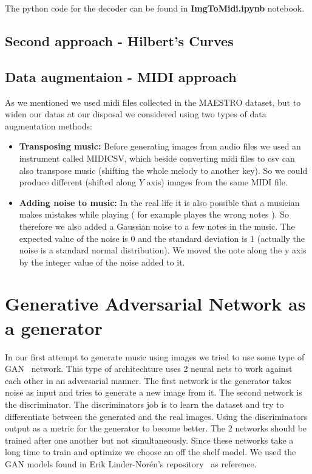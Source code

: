 \documentclass{article}
\begin{document}
	The python code for the decoder can be found in \textbf{ImgToMidi.ipynb} notebook.
	
\subsection{Second approach - Hilbert's Curves}



\subsection{Data augmentaion - MIDI approach}

As we mentioned we used midi files collected in the MAESTRO dataset, but to widen our datas at our disposal we considered using two types of data augmentation methods: 
\begin{itemize}
	\item \textbf{Transposing music: } Before generating images from audio files we used an instrument called MIDICSV, which beside converting midi files to csv can also transpose music (shifting the whole melody to another key). So we could produce different (shifted along $Y$ axis) images from the same MIDI file.
	
	\item \textbf{Adding noise to music: } In the real life it is also possible that a musician makes mistakes while playing ( for example playes the wrong notes ). So therefore we also added a Gaussian noise to a few notes in the music. The expected value of the noise is 0 and the standard deviation is 1 (actually the noise is a standard normal distribution). We moved the note along the y axis by the integer value of the noise added to it.
\end{itemize}

\section{Generative Adversarial Network as a generator}
\label{sec:gan}

In our first attempt to generate music using images we tried to use some type of GAN~\cite{gan} network. This type of architechture uses 2 neural nets to work against each other in an adversarial manner. The first network is the generator takes noise as input and tries to generate a new image from it. The second network is the discriminator. The discriminators job is to learn the dataset and try to differentiate between the generated and the real images. Using the discriminators output as a metric for the generator to become better. The 2 networks should be trained after one another but not simultaneously. Since these networks take a long time to train and optimize we choose an off the shelf model. We used the GAN models found in Erik Linder-Norén's repository~\cite{eriklindernoren} as reference. 
\end{document}
